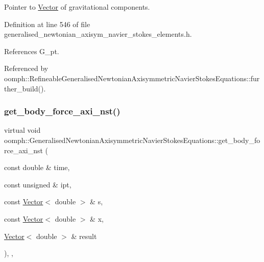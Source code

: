 Pointer to \hyperlink{classoomph_1_1Vector}{Vector} of gravitational components. 



Definition at line 546 of file generalised\+\_\+newtonian\+\_\+axisym\+\_\+navier\+\_\+stokes\+\_\+elements.\+h.



References G\+\_\+pt.



Referenced by oomph\+::\+Refineable\+Generalised\+Newtonian\+Axisymmetric\+Navier\+Stokes\+Equations\+::further\+\_\+build().

\mbox{\label{classoomph_1_1GeneralisedNewtonianAxisymmetricNavierStokesEquations_a99ba0574a9a918553ee96254ea743178}} 
\subsubsection{\texorpdfstring{get\+\_\+body\+\_\+force\+\_\+axi\+\_\+nst()}{get\_body\_force\_axi\_nst()}}
{\footnotesize\ttfamily virtual void oomph\+::\+Generalised\+Newtonian\+Axisymmetric\+Navier\+Stokes\+Equations\+::get\+\_\+body\+\_\+force\+\_\+axi\+\_\+nst (\begin{DoxyParamCaption}\item[{const double \&}]{time,  }\item[{const unsigned \&}]{ipt,  }\item[{const \hyperlink{classoomph_1_1Vector}{Vector}$<$ double $>$ \&}]{s,  }\item[{const \hyperlink{classoomph_1_1Vector}{Vector}$<$ double $>$ \&}]{x,  }\item[{\hyperlink{classoomph_1_1Vector}{Vector}$<$ double $>$ \&}]{result }\end{DoxyParamCaption})\hspace{0.3cm}{\ttfamily [inline]}, {\ttfamily [protected]}, {\ttfamily [virtual]}}



